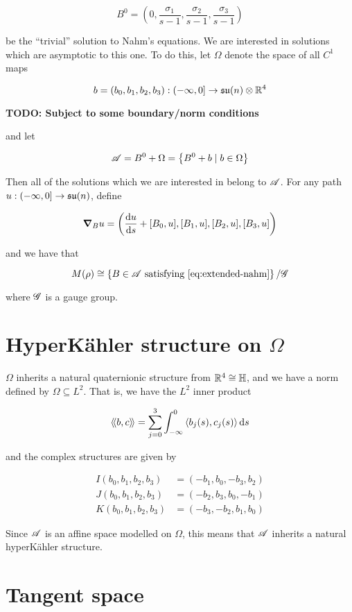 \documentclass{report}
\newcommand{\su}{\mathfrak{su}}
\newcommand{\iinner}[1]{\left\langle\!\left\langle #1 \right\rangle\!\right\rangle}
\begin{document}
\[B^0 = \left(0, \frac{\sigma_1}{s-1}, \frac{\sigma_2}{s-1}, \frac{\sigma_3}{s-1}\right)\]

be the ``trivial'' solution to Nahm's equations. We are interested in solutions which are asymptotic to this one. To do this, let \(\Omega\) denote the space of all \(C^1\) maps

\[b = (b_0, b_1, b_2, b_3) : \Ioc{-\infty, 0} \to \su(n) \otimes \R^4\]

\textbf{TODO: Subject to some boundary/norm conditions}

and let

\[\mathscr{A} = B^0 + \Omega = \left\{B^0 + b \mid b \in \Omega\right\}\]

Then all of the solutions which we are interested in belong to \(\mathscr{A}\). For any path \(u : \Ioc{-\infty, 0} \to \su(n)\), define

\[\grad_B u = \left(\dv{u}{s} + [B_0, u], [B_1, u], [B_2, u], [B_3, u]\right)\]

and we have that

\[M(\rho) \cong \left\{B \in \msA \text{ satisfying \cref{eq:extended-nahm}}\right\}/\msG\]

where \(\mathscr{G}\) is a gauge group.

\section{HyperK\"ahler structure on \(\Omega\)}

\(\Omega\) inherits a natural quaternionic structure from \(\mathbb{R}^4 \cong \mathbb{H}\), and we have a norm defined by \(\Omega \subseteq L^2\). That is, we have the \(L^2\) inner product

\[\iinner{b, c} = \sum_{j=0}^3\int_{-\infty}^0 \inner{b_j(s), c_j(s)}\dd s\]

and the complex structures are given by

\begin{align*}
    I(b_0, b_1, b_2, b_3) &= (-b_1, b_0, -b_3, b_2) \\
    J(b_0, b_1, b_2, b_3) &= (-b_2, b_3, b_0, -b_1) \\
    K(b_0, b_1, b_2, b_3) &= (-b_3, -b_2, b_1, b_0)
\end{align*}

Since \(\mathscr{A}\) is an affine space modelled on \(\Omega\), this means that \(\mathscr{A}\) inherits a natural hyperK\"ahler structure.

\section{Tangent space}
\end{document}
